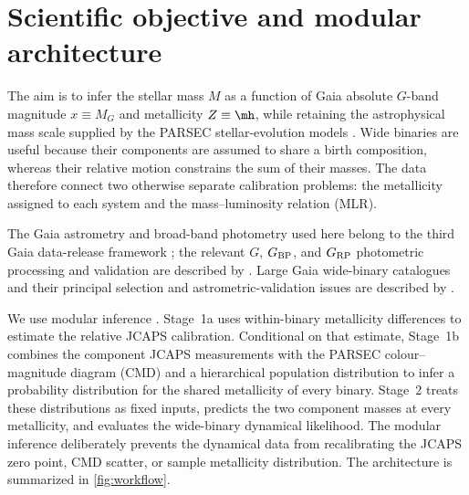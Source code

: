 \section{Scientific objective and modular architecture}
\label{sec:overview}

The aim is to infer the stellar mass $M$ as a function of Gaia absolute
$G$-band magnitude $x\equiv M_G$ and metallicity $Z\equiv\mh$, while retaining
the astrophysical mass scale supplied by the PARSEC stellar-evolution models
\citep{Bressan2012PARSEC}.  Wide binaries are useful because their components
are assumed to share a birth composition, whereas their relative motion
constrains the sum of their masses.  The data therefore connect two otherwise
separate calibration problems: the metallicity assigned to each system and the
mass--luminosity relation (MLR).

The Gaia astrometry and broad-band photometry used here belong to the third
Gaia data-release framework \citep{GaiaCollaboration2023DR3}; the relevant
$G$, $G_{\rm BP}$, and $G_{\rm RP}$ photometric processing and validation are
described by \citet{Riello2021GaiaEDR3Photometry}.  Large Gaia wide-binary
catalogues and their principal selection and astrometric-validation issues are
described by \citet{ElBadry2021MillionBinaries}.

We use modular inference
\citep{LiuBayarriBerger2009Modularization,Plummer2015Cuts}.  Stage~1a uses
within-binary metallicity differences to estimate the relative JCAPS
calibration.  Conditional on that estimate, Stage~1b combines the component
JCAPS measurements with the PARSEC colour--magnitude diagram (CMD) and a
hierarchical population distribution to infer a probability distribution for
the shared metallicity of every binary.  Stage~2 treats these distributions as
fixed inputs, predicts the two component masses at every metallicity, and
evaluates the wide-binary dynamical likelihood.  The modular inference deliberately prevents
the dynamical data from recalibrating the JCAPS zero point, CMD scatter, or
sample metallicity distribution.  The architecture is summarized in
\cref{fig:workflow}.

